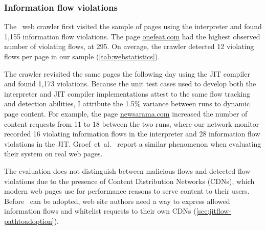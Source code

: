 \subsubsection{Information flow violations}

The \JitFlow\ web crawler first visited the sample of pages using the interpreter and found 1,155 information flow violations.
The page \url{onefeat.com} had the highest observed number of violating flows, at 295.
On average, the crawler detected 12 violating flows per page in our sample (\autoref{tab:webstatistics}).

The crawler revisited the same pages the following day using the JIT compiler and found 1,173 violations.
Because the unit test cases used to develop both the interpreter and JIT compiler implementations attest to the same flow tracking and detection abilities, I attribute the 1.5\% variance between runs to dynamic page content.
For example, the page \url{newsarama.com} increased the number of content requests from 11 to 18 between the two runs, where our network monitor recorded 16 violating information flows in the interpreter and 28 information flow violations in the JIT.
Groef~et~al.~\cite{groef.etal+12} report a similar phenomenon when evaluating their system on real web pages.

The evaluation does not distinguish between malicious flows and detected flow violations due to the presence of Content Distribution Networks (CDNs), which modern web pages use for performance reasons to serve content to their users.
Before \JitFlow\ can be adopted, web site authors need a way to express allowed information flows and whitelist requests to their own CDNs (\autoref{sec:jitflow-pathtoadoption}).

